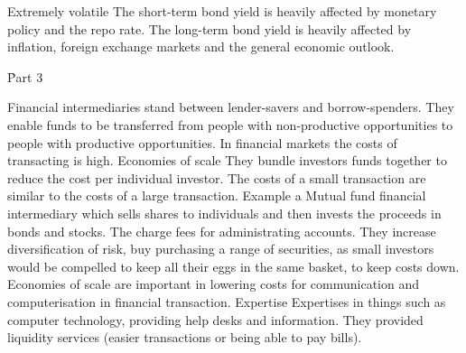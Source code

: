 \documentclass[12pt]{examnotes}
\begin{document}
\ra Extremely volatile
\ra The short-term bond yield is heavily affected by monetary policy and the repo rate.
\ra The long-term bond yield is heavily affected by inflation, foreign exchange markets and the general economic outlook.

\h{Part 3}

\ra Financial intermediaries stand between lender-savers and borrow-spenders. 
\ra They enable funds to be transferred from people with non-productive opportunities to people with productive opportunities. 
\ra In financial markets the costs of transacting is high. 
 Economies of scale
\rna They bundle investors funds together to reduce the cost per  individual investor.
\rna The costs of a small transaction are similar to the costs of a large transaction. 
\rna Example a Mutual fund financial intermediary which sells shares to individuals and then invests the proceeds in bonds and stocks. The charge fees for administrating accounts.
\rna They increase diversification of risk, buy purchasing a range of securities, as small investors would be compelled to keep all their eggs in the same basket, to keep costs down. 
\rna Economies of scale are important in lowering costs for communication and computerisation in financial transaction.
 Expertise
\rna Expertises in things such as computer technology, providing help desks and information. 
\rna They provided liquidity services (easier transactions or being able to pay bills).
\end{document}
